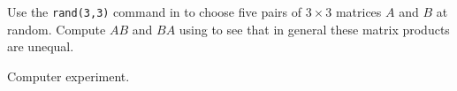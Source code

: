 \documentclass{ximera}
\begin{document}
\begin{computerExercise} \label{c4.7.2}
Use the {\tt rand(3,3)} command in \Matlab to choose five pairs of
$3\times 3$ matrices $A$ and $B$ at random.  Compute $AB$ and $BA$
using \Matlab to see that in general these matrix products are unequal.

\begin{solution}
Computer experiment.

\end{solution}
\end{computerExercise}
\end{document}
